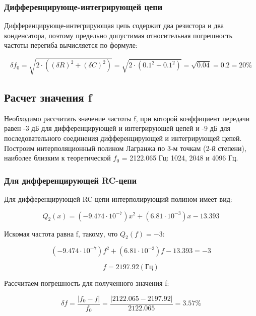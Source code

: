 \subsubsection{Дифференцирующе-интегрирующей цепи}

Дифференцирующе-интегрирующая цепь содержит два резистора и два конденсатора, поэтому предельно допустимая относительная погрешность частоты перегиба вычисляется по формуле:

\begin{equation}
\delta f_0 = \sqrt{2 \cdot ((\delta R)^2 + (\delta C)^2)} = \sqrt{2 \cdot (0.1^2 + 0.1^2)} = \sqrt{0.04} = 0.2 = 20 \%
\end{equation}

\subsection{Расчет значения f}
  Необходимо рассчитать значение частоты f, при которой коэффициент передачи равен -3 дБ для дифференцирующей и интегрирующей цепей и -9 дБ для последовательного соединения дифференцирующей и интегрирующей цепей. Построим интерполяционный полином Лагранжа по 3-м точкам (2-й степени), наиболее близким к теоретической $f_0$ = 2122.065 Гц: 1024, 2048 и 4096 Гц.
\subsubsection{Для дифференцирующей RC-цепи}

Для дифференцирующей RC-цепи интерполирующий полином имеет вид:

\begin{equation}
Q_2(x) = (-9.474 \cdot 10^{-7})x^2 + (6.81 \cdot 10^{-3})x -13.393  
\end{equation}

Искомая частота равна f, такому, что $Q_2(f) = -3$:

\begin{equation}
(-9.474 \cdot 10^{-7})f^2 + (6.81 \cdot 10^{-3})f -13.393 = -3
\end{equation}

\begin{equation}
f = 2197.92 (\text{Гц})
\end{equation}

Рассчитаем погрешность для полученного значения f:

\begin{equation}
\delta f = \frac{|f_0 - f|}{f_0} = \frac{|2122.065 - 2197.92|}{2122.065} = 3.57 \% 
\end{equation}

